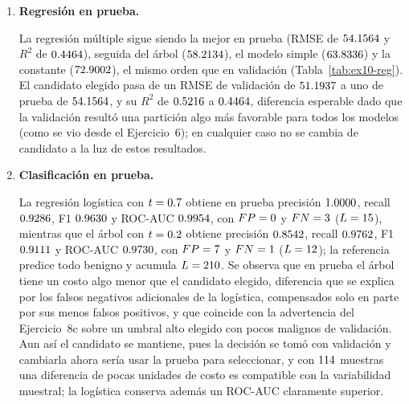 \begin{enumerate}

\item \textbf{Regresión en prueba.}

\begin{table}[H]
\centering
\resizebox{\textwidth}{!}{}
\caption{Modelos de regresión en prueba, con el RMSE de validación como referencia.}
\label{tab:ex10-reg}
\end{table}

La regresión múltiple sigue siendo la mejor en prueba (RMSE de
$54.1564$ y $R^2$ de $0.4464$), seguida del árbol
($58.2134$), el modelo simple ($63.8336$) y la constante
($72.9002$), el mismo orden que en validación
(Tabla~\ref{tab:ex10-reg}). El candidato elegido pasa de un RMSE de
validación de $51.1937$ a uno de prueba de
$54.1564$, y su $R^2$ de $0.5216$ a
$0.4464$, diferencia esperable dado que la validación resultó una
partición algo más favorable para todos los modelos (como se vio desde el
Ejercicio~6); en cualquier caso no se cambia de candidato a la luz de estos
resultados.

\item \textbf{Clasificación en prueba.}

\begin{table}[H]
\centering
\small

\caption{Clasificación en prueba con los umbrales congelados: métricas.}
\label{tab:ex10-clf-met}
\end{table}

\begin{table}[H]
\centering
\small

\caption{Clasificación en prueba con los umbrales congelados: errores y costo $L=FP+5FN$.}
\label{tab:ex10-clf-cost}
\end{table}

La regresión logística con $t=0.7$ obtiene en prueba precisión
$1.0000$, recall $0.9286$, F1 $0.9630$ y ROC-AUC
$0.9954$, con $FP=0$ y $FN=3$
($L=15$), mientras que el árbol con $t=0.2$ obtiene
precisión $0.8542$, recall $0.9762$, F1
$0.9111$ y ROC-AUC $0.9730$, con $FP=7$ y
$FN=1$ ($L=12$); la referencia predice todo
benigno y acumula $L=210$. Se observa que en prueba el árbol
tiene un costo algo menor que el candidato elegido, diferencia que se explica
por los falsos negativos adicionales de la logística, compensados solo en
parte por sus menos falsos positivos, y que coincide con la advertencia del
Ejercicio~8c sobre un umbral alto elegido con pocos malignos de validación.
Aun así el candidato se mantiene, pues la decisión se tomó con validación y
cambiarla ahora sería usar la prueba para seleccionar, y con $114$
muestras una diferencia de pocas unidades de costo es compatible con la
variabilidad muestral; la logística conserva además un ROC-AUC claramente
superior.


\end{enumerate}
